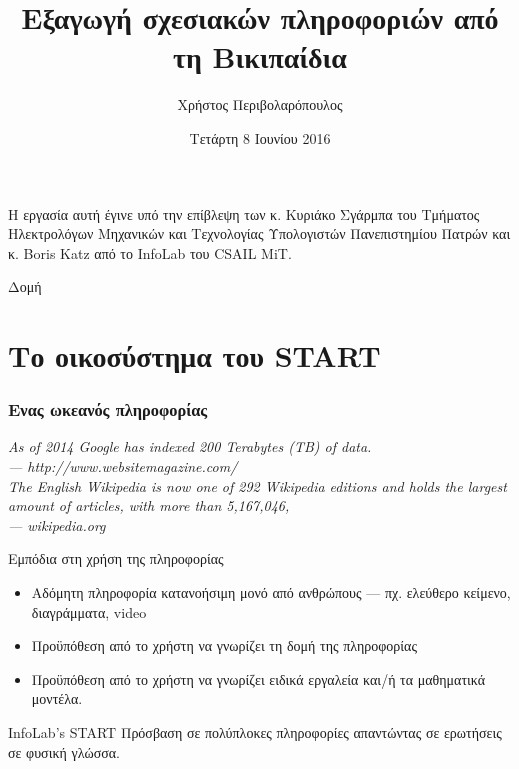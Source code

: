 \documentclass[bigger]{beamer}
\author{Χρήστος Περιβολαρόπουλος}
\date{Τετάρτη 8 Ιουνίου 2016}
\title{Εξαγωγή σχεσιακών πληροφοριών από τη Βικιπαίδια}
\begin{document}
\maketitle

\begin{frame}
  Η εργασία αυτή έγινε υπό την επίβλεψη των κ. Κυριάκο Σγάρμπα του
  Τμήματος Ηλεκτρολόγων Μηχανικών και Τεχνολογίας Υπολογιστών
  Πανεπιστημίου Πατρών και κ. Boris Katz από το InfoLab του CSAIL MiT.
\end{frame}

\begin{frame}{Δομή}
  \tableofcontents
\end{frame}

\section{Το οικοσύστημα του START}
\begin{frame}
  \frametitle{Ενας ωκεανός πληροφορίας}
  \textit{As of 2014 Google has indexed 200 Terabytes (TB) of data. \\
    \hfill --- http://www.websitemagazine.com/} \\

  \vfill
  \textit{The English Wikipedia is now one of 292 Wikipedia
    editions and holds the largest amount of articles, with more than
    5,167,046, \\ \hfill --- wikipedia.org }

  \vfiil
\end{frame}

\begin{frame}[fragile]{Εμπόδια στη χρήση της πληροφορίας}
  \begin{itemize}
  \item Αδόμητη πληροφορία κατανοήσιμη μονό από ανθρώπους ---
    πχ. ελεύθερο κείμενο, διαγράμματα, video
  \item Προϋπόθεση από το χρήστη να γνωρίζει τη δομή της πληροφορίας
  \item Προϋπόθεση από το χρήστη να γνωρίζει ειδικά εργαλεία και/ή τα
    μαθηματικά μοντέλα.
  \end{itemize}
\end{frame}

\begin{frame}[fragile]{InfoLab's START}
  Πρόσβαση σε πολύπλοκες πληροφορίες απαντώντας σε ερωτήσεις σε φυσική
  γλώσσα.
\end{frame}
\end{document}
